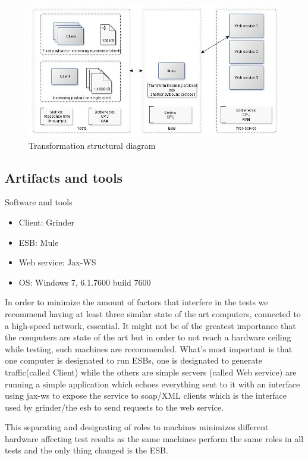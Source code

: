 \begin{figure}[H]
	\centerline{\includegraphics[scale=0.43]{img/transformation}}
	\caption{Transformation structural diagram}
	\label{fig:transform-diagram}
\end{figure}

\newpage
\subsection{Artifacts and tools}
\begin{table}[H]
	\caption{Software and tools}
	\label{table:sw-spec}
	\begin{itemize}
		\item Client: Grinder \cite{whatisgrinder}
		\item ESB: Mule \cite{whatismule}
		\item Web service: Jax-WS \cite{whatisjaxws}
		\item OS: Windows 7, 6.1.7600 build 7600
	\end{itemize}
\end{table}
In order to minimize the amount of factors that interfere in the tests we recommend having at least three similar state of the art computers, connected to a high-speed network, essential.
It might not be of the greatest importance that the computers are state of the art but in order to not reach a hardware ceiling while testing, such machines are recommended. 
What's most important is that one computer is designated to run ESBs, one is designated to generate traffic(called Client) while the others are simple servers (called Web service) are running a simple application which echoes everything sent to it with an interface using jax-ws to expose the service to soap/XML clients which is the interface used by grinder/the esb to send requests to the web service.

This separating and designating of roles to machines minimizes different hardware affecting test results as the same machines perform the same roles in all tests and the only thing changed is the ESB. 

